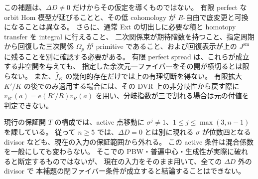 \begin{remark}[この判定で残る閉ファイバー条件]
\label{rem:nfm-period-integral-presentation-scope}
この補題は、$\Delta D\ne0$ だけからその仮定を導くものではない。
有限 perfect な orbit Hom 模型が延びることと、その低 cohomology が
$R$-自由で底変更と可換になることは異なる。
さらに、通常 Ext の切出しに必要な積と homotopy transfer を integral に行えること、
二次関係束が期待階数を持つこと、指定周期から回復した三次関係
$\Omega_p$ が primitive であること、および回復表示が上の
$J^{\mathrm{sm}}$ に残ることを別に確認する必要がある。
有限 perfect spread は、これらが成立する非空開を与えても、
指定した余次元一ファイバーをその開が横切るとは限らない。
また、$\bar f_K$ の幾何的存在だけでは上の有理切断を得ない。
有限拡大 $K'/K$ の後でのみ適用する場合には、その DVR 上の非分岐性から戻す際に
$v_{R'}(a)=e(R'/R)v_R(a)$ を用い、分岐指数が三で割れる場合は元の付値を判定できない。


現行の保証開 $T$ の構成では、active 点移動に
$\sigma^j\ne1$、$1\le j\le\max(3,n-1)$ を課している。
従って $n\ge5$ では、$\Delta D=0$ とは別に現れる
$\sigma$ が位数四となる divisor なども、現在の入力の保証範囲から外れる。
この active 条件は混合係数を一般にしても変わらない。
そこでの PBW・普遍中心・生成性が実際に破れると断定するものではないが、
現在の入力をそのまま用いて、全ての $\Delta D$ 外の divisor で
本補題の閉ファイバー条件が成立すると結論することはできない。
\end{remark}
